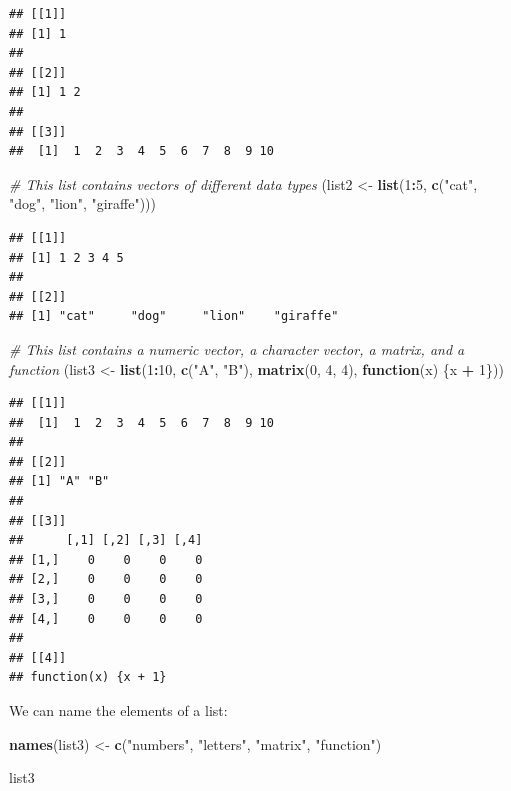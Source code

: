 \documentclass[
]{book}
\newenvironment{Shaded}{\begin{snugshade}}{\end{snugshade}}
\newcommand{\CommentTok}[1]{\textcolor[rgb]{0.56,0.35,0.01}{\textit{#1}}}
\newcommand{\ControlFlowTok}[1]{\textcolor[rgb]{0.13,0.29,0.53}{\textbf{#1}}}
\newcommand{\DecValTok}[1]{\textcolor[rgb]{0.00,0.00,0.81}{#1}}
\newcommand{\FunctionTok}[1]{\textcolor[rgb]{0.13,0.29,0.53}{\textbf{#1}}}
\newcommand{\NormalTok}[1]{#1}
\newcommand{\OtherTok}[1]{\textcolor[rgb]{0.56,0.35,0.01}{#1}}
\newcommand{\SpecialCharTok}[1]{\textcolor[rgb]{0.81,0.36,0.00}{\textbf{#1}}}
\newcommand{\StringTok}[1]{\textcolor[rgb]{0.31,0.60,0.02}{#1}}
\begin{document}
\begin{verbatim}
## [[1]]
## [1] 1
## 
## [[2]]
## [1] 1 2
## 
## [[3]]
##  [1]  1  2  3  4  5  6  7  8  9 10
\end{verbatim}

\begin{Shaded}
\begin{Highlighting}[]
\CommentTok{\# This list contains vectors of different data types}
\NormalTok{(list2 }\OtherTok{\textless{}{-}} \FunctionTok{list}\NormalTok{(}\DecValTok{1}\SpecialCharTok{:}\DecValTok{5}\NormalTok{, }\FunctionTok{c}\NormalTok{(}\StringTok{"cat"}\NormalTok{, }\StringTok{"dog"}\NormalTok{, }\StringTok{"lion"}\NormalTok{, }\StringTok{"giraffe"}\NormalTok{)))}
\end{Highlighting}
\end{Shaded}

\begin{verbatim}
## [[1]]
## [1] 1 2 3 4 5
## 
## [[2]]
## [1] "cat"     "dog"     "lion"    "giraffe"
\end{verbatim}

\begin{Shaded}
\begin{Highlighting}[]
\CommentTok{\# This list contains a numeric vector, a character vector, a matrix, and a function}
\NormalTok{(list3 }\OtherTok{\textless{}{-}} \FunctionTok{list}\NormalTok{(}\DecValTok{1}\SpecialCharTok{:}\DecValTok{10}\NormalTok{, }\FunctionTok{c}\NormalTok{(}\StringTok{"A"}\NormalTok{, }\StringTok{"B"}\NormalTok{), }\FunctionTok{matrix}\NormalTok{(}\DecValTok{0}\NormalTok{, }\DecValTok{4}\NormalTok{, }\DecValTok{4}\NormalTok{), }\ControlFlowTok{function}\NormalTok{(x) \{x }\SpecialCharTok{+} \DecValTok{1}\NormalTok{\}))}
\end{Highlighting}
\end{Shaded}

\begin{verbatim}
## [[1]]
##  [1]  1  2  3  4  5  6  7  8  9 10
## 
## [[2]]
## [1] "A" "B"
## 
## [[3]]
##      [,1] [,2] [,3] [,4]
## [1,]    0    0    0    0
## [2,]    0    0    0    0
## [3,]    0    0    0    0
## [4,]    0    0    0    0
## 
## [[4]]
## function(x) {x + 1}
\end{verbatim}

We can name the elements of a list:

\begin{Shaded}
\begin{Highlighting}[]
\FunctionTok{names}\NormalTok{(list3) }\OtherTok{\textless{}{-}} \FunctionTok{c}\NormalTok{(}\StringTok{"numbers"}\NormalTok{, }\StringTok{"letters"}\NormalTok{, }\StringTok{"matrix"}\NormalTok{, }\StringTok{"function"}\NormalTok{)}

\NormalTok{list3}
\end{Highlighting}
\end{Shaded}
\end{document}
